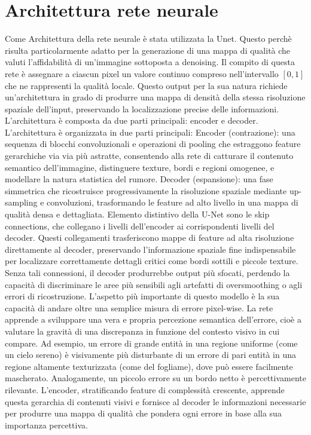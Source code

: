 \section{Architettura rete neurale}
Come Architettura della rete neurale è stata utilizzata la Unet. Questo perchè risulta particolarmente adatto per la 
generazione di una mappa di qualità che valuti l'affidabilità di un'immagine sottoposta a denoising. Il compito di 
questa rete è assegnare a ciascun pixel un valore continuo compreso nell'intervallo $[0,1]$ che ne rappresenti la 
qualità locale. Questo output per la sua natura richiede un'architettura in grado di produrre una mappa di densità 
della stessa risoluzione spaziale dell'input, preservando la localizzazione precise delle informazioni. 
L'architettura è composta da due parti principali: encoder e decoder. 
L’architettura è organizzata in due parti principali:
Encoder (contrazione): una sequenza di blocchi convoluzionali e operazioni di pooling che estraggono feature 
gerarchiche via via più astratte, consentendo alla rete di catturare il contenuto semantico dell’immagine, 
distinguere texture, bordi e regioni omogenee, e modellare la natura statistica del rumore.
Decoder (espansione): una fase simmetrica che ricostruisce progressivamente la risoluzione spaziale 
mediante up-sampling e convoluzioni, trasformando le feature ad alto livello in una mappa di 
qualità densa e dettagliata.
Elemento distintivo della U-Net sono le skip connections, che collegano i livelli dell’encoder ai corrispondenti 
livelli del decoder. Questi collegamenti trasferiscono mappe di feature ad alta risoluzione direttamente al decoder, 
preservando l’informazione spaziale fine indispensabile per localizzare correttamente dettagli critici come bordi 
sottili e piccole texture. Senza tali connessioni, il decoder produrrebbe output più sfocati, perdendo la capacità 
di discriminare le aree più sensibili agli artefatti di oversmoothing o agli errori di ricostruzione.
L’aspetto più importante di questo modello è la sua capacità di andare oltre una semplice misura di errore pixel-wise. 
La rete apprende a sviluppare una vera e propria percezione semantica dell’errore, cioè a valutare la gravità di una 
discrepanza in funzione del contesto visivo in cui compare. Ad esempio, un errore di grande entità in una regione 
uniforme (come un cielo sereno) è visivamente più disturbante di un errore di pari entità in una regione altamente 
texturizzata (come del fogliame), dove può essere facilmente mascherato. Analogamente, un piccolo errore su un bordo 
netto è percettivamente rilevante. L’encoder, stratificando feature di complessità crescente, apprende questa gerarchia 
di contenuti visivi e fornisce al decoder le informazioni necessarie per produrre una mappa di qualità che pondera 
ogni errore in base alla sua importanza percettiva.

